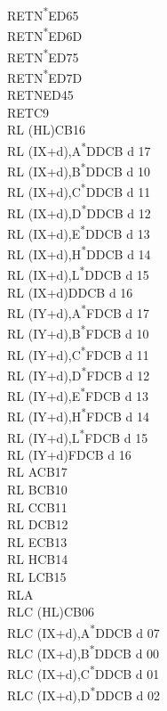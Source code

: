 \documentclass[twoside,openright,a4paper]{book}
\begin{document}
\begin{multicols}{3}
{\begin{tabbing}
	RETN\textsuperscript{*}\>ED65\\
	RETN\textsuperscript{*}\>ED6D\\
	RETN\textsuperscript{*}\>ED75\\
	RETN\textsuperscript{*}\>ED7D\\
	RETN\>ED45\\
	RET\>C9\\
	RL (HL)\>CB16\\
	RL (IX+d),A\textsuperscript{*}\>DDCB d 17\\
	RL (IX+d),B\textsuperscript{*}\>DDCB d 10\\
	RL (IX+d),C\textsuperscript{*}\>DDCB d 11\\
	RL (IX+d),D\textsuperscript{*}\>DDCB d 12\\
	RL (IX+d),E\textsuperscript{*}\>DDCB d 13\\
	RL (IX+d),H\textsuperscript{*}\>DDCB d 14\\
	RL (IX+d),L\textsuperscript{*}\>DDCB d 15\\
	RL (IX+d)\>DDCB d 16\\
	RL (IY+d),A\textsuperscript{*}\>FDCB d 17\\
	RL (IY+d),B\textsuperscript{*}\>FDCB d 10\\
	RL (IY+d),C\textsuperscript{*}\>FDCB d 11\\
	RL (IY+d),D\textsuperscript{*}\>FDCB d 12\\
	RL (IY+d),E\textsuperscript{*}\>FDCB d 13\\
	RL (IY+d),H\textsuperscript{*}\>FDCB d 14\\
	RL (IY+d),L\textsuperscript{*}\>FDCB d 15\\
	RL (IY+d)\>FDCB d 16\\
	RL A\>CB17\\
	RL B\>CB10\\
	RL C\>CB11\\
	RL D\>CB12\\
	RL E\>CB13\\
	RL H\>CB14\\
	RL L\>CB15\\
	RLA\\
	RLC (HL)\>CB06\\
	RLC (IX+d),A\textsuperscript{*}\>DDCB d 07\\
	RLC (IX+d),B\textsuperscript{*}\>DDCB d 00\\
	RLC (IX+d),C\textsuperscript{*}\>DDCB d 01\\
	RLC (IX+d),D\textsuperscript{*}\>DDCB d 02\\

\end{tabbing}}
\end{multicols}
\end{document}
